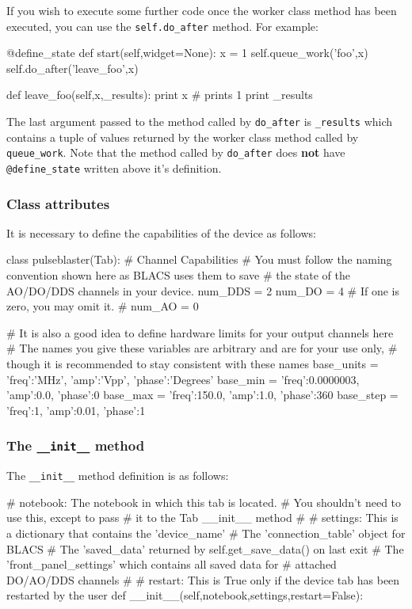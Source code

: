 \documentclass[12pt]{article}
\begin{document}
If you wish to execute some further code once the worker class method has been executed, you can use the \texttt{self.do\_after} method. For example:
\begin{python}
    @define_state
    def start(self,widget=None):
        x = 1
        self.queue_work('foo',x)
        self.do_after('leave_foo',x)
        
    def leave_foo(self,x,_results):
        print x # prints 1
        print _results
\end{python}
The last argument passed to the method called by \texttt{do\_after} is \texttt{\_results} which contains a tuple of values returned by the worker class method called by \texttt{queue\_work}. Note that the method called by \texttt{do\_after} does \textbf{not} have \texttt{@define\_state} written above it's definition.

\subsubsection{Class attributes}\label{device_class_attributes}
It is necessary to define the capabilities of the device as follows:
\begin{python}
class pulseblaster(Tab):
    # Channel Capabilities
    # You must follow the naming convention shown here as BLACS uses them to save
    # the state of the AO/DO/DDS channels in your device.
    num_DDS = 2
    num_DO = 4 
    # If one is zero, you may omit it.
    # num_AO = 0
    
    # It is also a good idea to define hardware limits for your output channels here
    # The names you give these variables are arbitrary and are for your use only,
    # though it is recommended to stay consistent with these names
    base_units = {'freq':'MHz',     'amp':'Vpp', 'phase':'Degrees'}
    base_min =   {'freq':0.0000003, 'amp':0.0,   'phase':0}
    base_max =   {'freq':150.0,     'amp':1.0,   'phase':360}
    base_step =  {'freq':1,         'amp':0.01,  'phase':1}
\end{python}

\subsubsection{The \texttt{\_\_init\_\_} method}\label{device_class_init}
The \texttt{\_\_init\_\_} method definition is as follows:
\begin{python}
    # notebook: The notebook in which this tab is located. 
    #           You shouldn't need to use this, except to pass
    #           it to the Tab __init__ method
    #
    # settings: This is a dictionary that contains the 'device_name'
    #           The 'connection_table' object for BLACS
    #           The 'saved_data' returned by self.get_save_data() on last exit
    #           The 'front_panel_settings' which contains all saved data for
    #           attached DO/AO/DDS channels
    #
    # restart: This is True only if the device tab has been restarted by the user
    def __init__(self,notebook,settings,restart=False):
\end{python}
\end{document}
